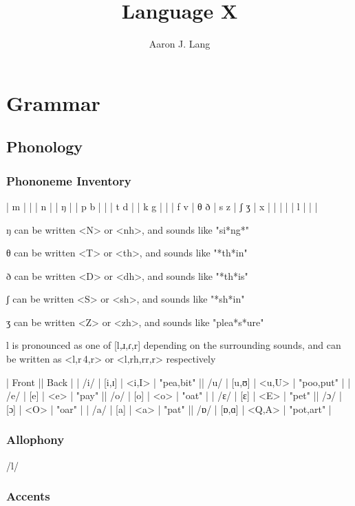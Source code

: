 \documentclass{memoir}
\title{Language X}
\author{Aaron J. Lang}
\begin{document}
\frontmatter
\maketitle
\newpage
\tableofcontents
\mainmatter

\part{Grammar}
\chapter{Phonology}

\section{Phononeme Inventory}

| m   |     |     | n   |     | ŋ   |
| p b |     |     | t d |     | k g |
|     | f v | θ ð | s z | ʃ ʒ | x   |
|     |     |     | l   |     |     |

ŋ can be written <N> or <nh>, and sounds like "si*ng*"

θ can be written <T> or <th>, and sounds like "*th*in"

ð can be written <D> or <dh>, and sounds like "*th*is"

ʃ can be written <S> or <sh>, and sounds like "*sh*in"

ʒ can be written <Z> or <zh>, and sounds like "plea*s*ure"

l is pronounced as one of [l,ɹ,ɾ,r] depending on the surrounding sounds,
and can be written as <l,r\,4,r> or <l,rh,rr,r> respectively

    | Front                           || Back                            |
    | /i/ | [i,ɪ] | <i,I> | "pea,bit" || /u/ | [u,ʊ] | <u,U> | "poo,put" |
    | /e/ | [e]   | <e>   | "pay"     || /o/ | [o]   | <o>   | "oat"     |
    | /ɛ/ | [ɛ]   | <E>   | "pet"     || /ɔ/ | [ɔ]   | <O>   | "oar"     |
    | /a/ | [a]   | <a>   | "pat"     || /ɒ/ | [ɒ,ɑ] | <Q,A> | "pot,art" |

\section{Allophony}

/l/

\section{Accents}
\end{document}
